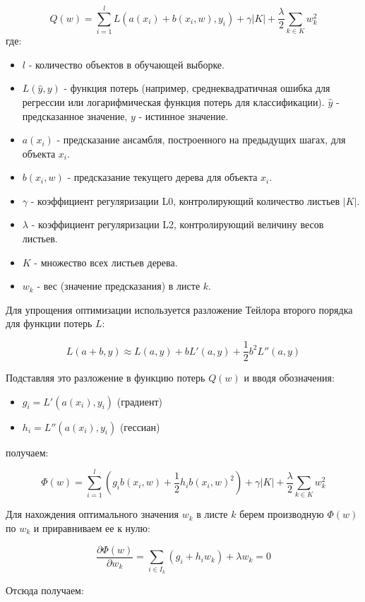 \[
Q(w) = \sum_{i=1}^l L(a(x_i) + b(x_i, w), y_i) + \gamma|K| + \frac{\lambda}{2} \sum_{k \in K} w_k^2
\] 
где:

\begin{itemize}
    \item $l$ - количество объектов в обучающей выборке.
    \item $L(\hat{y}, y)$ - функция потерь (например, среднеквадратичная ошибка для регрессии или логарифмическая функция потерь для классификации).  $\hat{y}$ - предсказанное значение, $y$ - истинное значение.
    \item $a(x_i)$ - предсказание ансамбля, построенного на предыдущих шагах, для объекта $x_i$.
    \item $b(x_i, w)$ - предсказание текущего дерева для объекта $x_i$.
    \item $\gamma$ - коэффициент регуляризации L0, контролирующий количество листьев $|K|$.
    \item $\lambda$ - коэффициент регуляризации L2, контролирующий величину весов листьев.
    \item $K$ - множество всех листьев дерева.
    \item $w_k$ - вес (значение предсказания) в листе $k$.
\end{itemize}

Для упрощения оптимизации используется разложение Тейлора второго порядка для функции потерь $L$:

\[
L(a + b, y) \approx L(a, y) + bL'(a, y) + \frac{1}{2} b^2 L''(a, y)
\]

Подставляя это разложение в функцию потерь $Q(w)$ и вводя обозначения:

\begin{itemize}
    \item $g_i = L'(a(x_i), y_i)$ (градиент)
    \item $h_i = L''(a(x_i), y_i)$ (гессиан)
\end{itemize}

получаем:

\[
\Phi(w) =  \sum_{i=1}^l \left(g_i b(x_i, w) + \frac{1}{2} h_i b(x_i, w)^2\right) + \gamma|K| + \frac{\lambda}{2} \sum_{k \in K} w_k^2
\]


Для нахождения оптимального значения $w_k$ в листе $k$ берем производную $\Phi(w)$ по $w_k$ и приравниваем ее к нулю:

\[
\frac{\partial \Phi(w)}{\partial w_k} = \sum_{i \in I_k} (g_i + h_i w_k) + \lambda w_k = 0
\]

Отсюда получаем:

